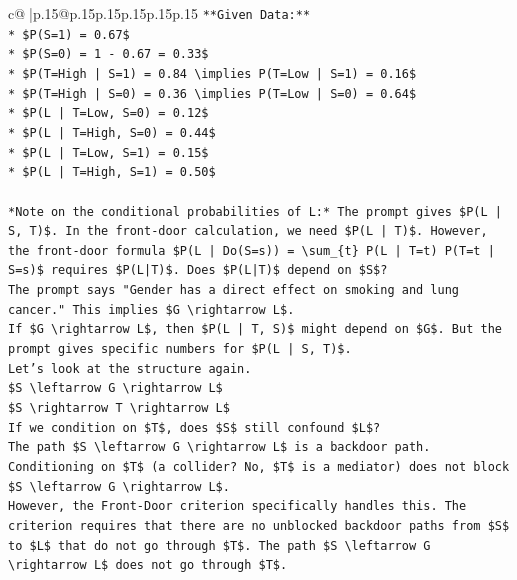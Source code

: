 \documentclass{article}
\begin{document}
{\begin{supertabular}{c@{$\;$}|p{.15\linewidth}@{}p{.15\linewidth}p{.15\linewidth}p{.15\linewidth}p{.15\linewidth}p{.15\linewidth}}
{{{\texttt{**Given Data:**} \\
\texttt{*   \$P(S=1) = 0.67\$} \\
\texttt{*   \$P(S=0) = 1 {-} 0.67 = 0.33\$} \\
\texttt{*   \$P(T=High | S=1) = 0.84 \textbackslash{}implies P(T=Low | S=1) = 0.16\$} \\
\texttt{*   \$P(T=High | S=0) = 0.36 \textbackslash{}implies P(T=Low | S=0) = 0.64\$} \\
\texttt{*   \$P(L | T=Low, S=0) = 0.12\$} \\
\texttt{*   \$P(L | T=High, S=0) = 0.44\$} \\
\texttt{*   \$P(L | T=Low, S=1) = 0.15\$} \\
\texttt{*   \$P(L | T=High, S=1) = 0.50\$} \\
\\ 
\texttt{*Note on the conditional probabilities of L:* The prompt gives \$P(L | S, T)\$. In the front{-}door calculation, we need \$P(L | T)\$. However, the front{-}door formula \$P(L | Do(S=s)) = \textbackslash{}sum\_\{t\} P(L | T=t) P(T=t | S=s)\$ requires \$P(L|T)\$. Does \$P(L|T)\$ depend on \$S\$?} \\
\texttt{The prompt says "Gender has a direct effect on smoking and lung cancer." This implies \$G \textbackslash{}rightarrow L\$.} \\
\texttt{If \$G \textbackslash{}rightarrow L\$, then \$P(L | T, S)\$ might depend on \$G\$. But the prompt gives specific numbers for \$P(L | S, T)\$.} \\
\texttt{Let's look at the structure again.} \\
\texttt{\$S \textbackslash{}leftarrow G \textbackslash{}rightarrow L\$} \\
\texttt{\$S \textbackslash{}rightarrow T \textbackslash{}rightarrow L\$} \\
\texttt{If we condition on \$T\$, does \$S\$ still confound \$L\$?} \\
\texttt{The path \$S \textbackslash{}leftarrow G \textbackslash{}rightarrow L\$ is a backdoor path. Conditioning on \$T\$ (a collider? No, \$T\$ is a mediator) does not block \$S \textbackslash{}leftarrow G \textbackslash{}rightarrow L\$.} \\
\texttt{However, the Front{-}Door criterion specifically handles this. The criterion requires that there are no unblocked backdoor paths from \$S\$ to \$L\$ that do not go through \$T\$. The path \$S \textbackslash{}leftarrow G \textbackslash{}rightarrow L\$ does not go through \$T\$.} \\
}}}
\end{supertabular}}
\end{document}
